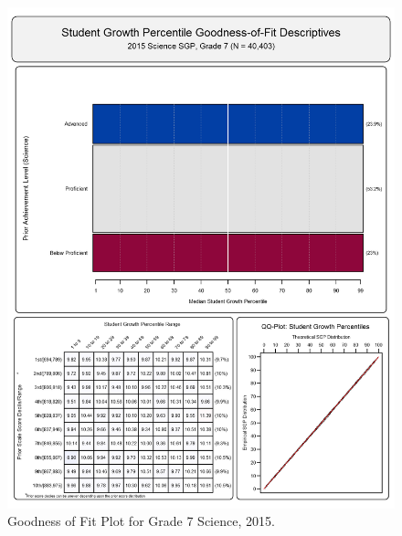 \documentclass[12pt]{article}
\begin{document}
\begin{figure}[htbp]
\centering
\includegraphics{../img/Goodness_of_Fit/SCIENCE.2015/2015_SCIENCE_7;2014_SCIENCE_6;2013_SCIENCE_5;2012_SCIENCE_4.png}
\caption{Goodness of Fit Plot for Grade 7 Science, 2015.}
\end{figure}
\end{document}
